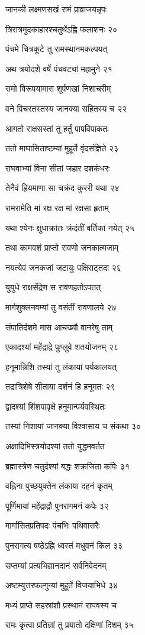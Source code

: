 जानकी लक्ष्मणसखं रामं प्राव्राजयन्नृपः

त्रिरात्रमुदकाहारश्चतुर्थेऽह्नि फलाशनः २०

पंचमे चित्रकूटे तु रामस्थानमकल्पयत्

अथ त्रयोदशे वर्षे पंचवट्यां महामुने २१

रामो विरूपयामास शूर्पणखां निशाचरीम्

वने विचरतस्तस्य जानक्या सहितस्य च २२

आगतो राक्षसस्तां तु हर्तुं पापविपाकतः

ततो माघासिताष्टम्यां मुहूर्ते वृंदसंज्ञिते २३

राघवाभ्यां विना सीतां जहार दशकंधरः

तेनैवं ह्रियमाणा सा चक्रंद कुररी यथा २४

रामरामेति मां रक्ष रक्ष मां रक्षसा हृताम्

यथा श्येनः क्षुधाक्रांतः क्रंदंतीं वर्तिकां नयेत् २५

तथा कामवशं प्राप्तो रावणो जनकात्मजाम्

नयत्येवं जनकजां जटायुः पक्षिराट्तदा २६

युयुधे राक्षसेंद्रेण स रावणहतोऽपतत्

मार्गशुक्लनवम्यां तु वसंतीं रावणालये २७

संपातिर्दशमे मास आचख्यौ वानरेषु ताम्

एकादश्यां महेंद्राद्रे पुःप्लुवे शतयोजनम् २८

हनूमान्निशि तस्यां तु लंकायां पर्यकालयत्

तद्रात्रिशेषे सीताया दर्शनं हि हनूमतः २९

द्वादश्यां शिंशपावृक्षे हनूमान्पर्यवस्थितः

तस्यां निशायां जानक्या विश्वासाय च संकथा ३०

अक्षादिभिस्त्रयोदश्यां ततो युद्धमवर्तत

ब्रह्मास्त्रेण चतुर्दश्यां बद्धः शक्रजिता कपिः ३१

वह्निना पुच्छयुक्तेन लंकाया दहनं कृतम्

पूर्णिमायां महेंद्राद्रौ पुनरागमनं कपेः ३२

मार्गासितप्रतिपदः पंचभिः पथिवासरैः

पुनरागत्य षष्ठेऽह्नि ध्वस्तं मधुवनं किल ३३

सप्तम्यां प्रत्यभिज्ञानदानं सर्वनिवेदनम्

अष्टम्युत्तरफल्गुन्यां मुहूर्ते विजयाभिधे ३४

मध्यं प्राप्ते सहस्रांशौ प्रस्थानं राघवस्य च

रामः कृत्वा प्रतिज्ञां तु प्रयातो दक्षिणां दिशम् ३५

